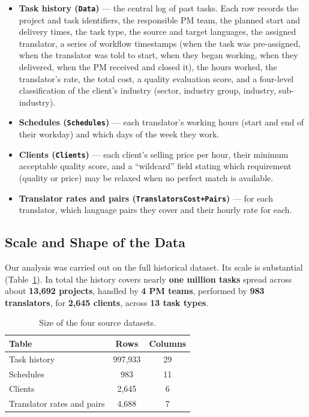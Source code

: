 \documentclass[9pt,a4paper,twoside]{utils/tau-class/tau}
\begin{document}
\begin{itemize}
    \item \textbf{Task history (\texttt{Data})} --- the central log of past tasks. Each row records the project and task identifiers, the responsible PM team, the planned start and delivery times, the task type, the source and target languages, the assigned translator, a series of workflow timestamps (when the task was pre-assigned, when the translator was told to start, when they began working, when they delivered, when the PM received and closed it), the hours worked, the translator's rate, the total cost, a quality evaluation score, and a four-level classification of the client's industry (sector, industry group, industry, sub-industry).
    \item \textbf{Schedules (\texttt{Schedules})} --- each translator's working hours (start and end of their workday) and which days of the week they work.
    \item \textbf{Clients (\texttt{Clients})} --- each client's selling price per hour, their minimum acceptable quality score, and a ``wildcard'' field stating which requirement (quality or price) may be relaxed when no perfect match is available.
    \item \textbf{Translator rates and pairs (\texttt{TranslatorsCost+Pairs})} --- for each translator, which language pairs they cover and their hourly rate for each.
\end{itemize}

\subsection{Scale and Shape of the Data}

Our analysis was carried out on the full historical dataset. Its scale is substantial (Table~\ref{tab:data-scale}). In total the history covers nearly \textbf{one million tasks} spread across about \textbf{13,692 projects}, handled by \textbf{4 PM teams}, performed by \textbf{983 translators}, for \textbf{2,645 clients}, across \textbf{13 task types}.

\begin{table}[H]
    \centering
    \caption{Size of the four source datasets.}
    \label{tab:data-scale}
    \footnotesize
    \begin{tabular}{p{}cc}
        \toprule
        \textbf{Table} & \textbf{Rows} & \textbf{Columns} \\
        \midrule
        Task history & 997,933 & 29 \\
        Schedules & 983 & 11 \\
        Clients & 2,645 & 6 \\
        Translator rates and pairs & 4,688 & 7 \\
        \bottomrule
    \end{tabular}
\end{table}
\end{document}
